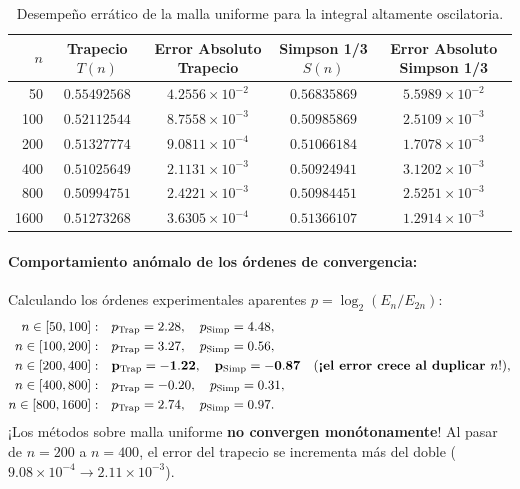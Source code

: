 \documentclass[11pt,a4paper]{article}
\begin{document}
\begin{table}[h!]
\centering
\caption{Desempeño errático de la malla uniforme para la integral altamente oscilatoria.}
\label{tab:ejercicio6_uniforme}
\begin{tabular}{rcccc}
\toprule
$n$ & Trapecio $T(n)$ & Error Absoluto Trapecio & Simpson 1/3 $S(n)$ & Error Absoluto Simpson 1/3 \\
\midrule
50   & $0.55492568$ & $4.2556\times 10^{-2}$ & $0.56835869$ & $5.5989\times 10^{-2}$ \\
100  & $0.52112544$ & $8.7558\times 10^{-3}$ & $0.50985869$ & $2.5109\times 10^{-3}$ \\
200  & $0.51327774$ & $9.0811\times 10^{-4}$ & $0.51066184$ & $1.7078\times 10^{-3}$ \\
400  & $0.51025649$ & $2.1131\times 10^{-3}$ & $0.50924941$ & $3.1202\times 10^{-3}$ \\
800  & $0.50994751$ & $2.4221\times 10^{-3}$ & $0.50984451$ & $2.5251\times 10^{-3}$ \\
1600 & $0.51273268$ & $3.6305\times 10^{-4}$ & $0.51366107$ & $1.2914\times 10^{-3}$ \\
\bottomrule
\end{tabular}
\end{table}

\paragraph{Comportamiento anómalo de los órdenes de convergencia:}
Calculando los órdenes experimentales aparentes $p = \log_2(E_n / E_{2n})$:
\begin{align}
    n \in [50, 100]: &\quad p_{\text{Trap}} = 2.28, \quad p_{\text{Simp}} = 4.48, \\
    n \in [100, 200]: &\quad p_{\text{Trap}} = 3.27, \quad p_{\text{Simp}} = 0.56, \\
    n \in [200, 400]: &\quad \mathbf{p_{\text{Trap}} = -1.22}, \quad \mathbf{p_{\text{Simp}} = -0.87} \quad (\text{\textbf{¡el error crece al duplicar }} n\text{!),} \\
    n \in [400, 800]: &\quad p_{\text{Trap}} = -0.20, \quad p_{\text{Simp}} = 0.31, \\
    n \in [800, 1600]: &\quad p_{\text{Trap}} = 2.74, \quad p_{\text{Simp}} = 0.97.
\end{align}
¡Los métodos sobre malla uniforme \textbf{no convergen monótonamente}! Al pasar de $n=200$ a $n=400$, el error del trapecio se incrementa más del doble ($9.08\times 10^{-4} \to 2.11\times 10^{-3}$).
\end{document}
